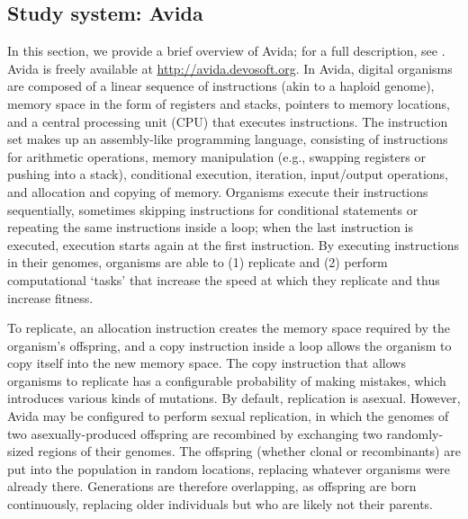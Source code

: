 \begin{doublespace}
\section*{Study system: Avida}
\label{sec:avida}

In this section, we provide a brief overview of Avida;
for a full description, see \cite{ofr04}.
%
Avida is freely available at \url{http://avida.devosoft.org}.
%
In Avida, digital organisms are composed of
a linear sequence of instructions (akin to a haploid genome),
memory space in the form of registers and stacks,
pointers to memory locations,
and a central processing unit (CPU) that executes instructions.
%
The instruction set makes up an assembly-like programming language,
consisting of instructions for arithmetic operations,
memory manipulation (e.g., swapping registers or pushing into a stack),
conditional execution, iteration, input/output operations,
and allocation and copying of memory.
%
Organisms execute their instructions sequentially,
sometimes skipping instructions for conditional statements
or repeating the same instructions inside a loop;
when the last instruction is executed,
execution starts again at the first instruction.
%
By executing instructions in their genomes,
organisms are able to (1) replicate and (2) perform computational `tasks'
that increase the speed at which they replicate and thus increase fitness.



To replicate, an allocation instruction creates the memory space
required by the organism's offspring, and a copy instruction inside a loop
allows the organism to copy itself into the new memory space.
%
The copy instruction that allows organisms to replicate
has a configurable probability of making mistakes,
which introduces various kinds of mutations.
%
By default, replication is asexual.
%
However, Avida may be configured to perform sexual replication,
in which the genomes of two asexually-produced offspring are recombined
by exchanging two randomly-sized regions of their genomes.
%
The offspring (whether clonal or recombinants) are put into the population
in random locations, replacing whatever organisms were already there.
%
Generations are therefore overlapping, as offspring are born continuously,
replacing older individuals but who are likely not their parents.




\end{doublespace}
